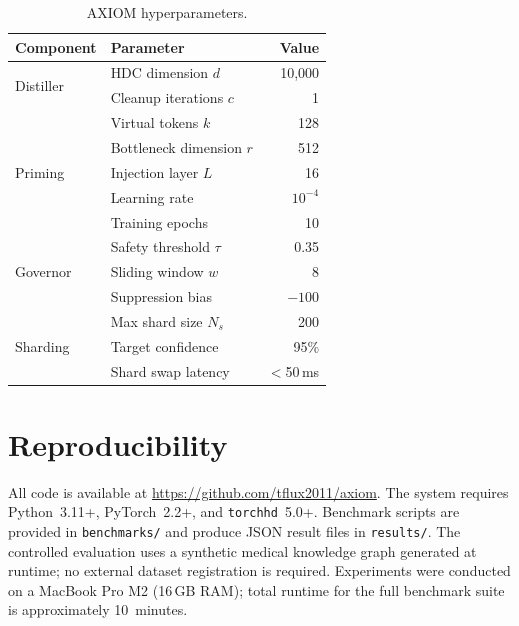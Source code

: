 \documentclass[11pt,a4paper]{article}
\begin{document}
\begin{table}[h]
    \centering
    \caption{AXIOM hyperparameters.}
    \label{tab:hyperparams}
    \begin{tabular}{@{}llr@{}}
        \toprule
        \textbf{Component} & \textbf{Parameter} & \textbf{Value} \\
        \midrule
        \multirow{2}{*}{Distiller}
            & HDC dimension $d$ & 10{,}000 \\
            & Cleanup iterations $c$ & 1 \\
        \midrule
        \multirow{5}{*}{Priming}
            & Virtual tokens $k$ & 128 \\
            & Bottleneck dimension $r$ & 512 \\
            & Injection layer $L$ & 16 \\
            & Learning rate & $10^{-4}$ \\
            & Training epochs & 10 \\
        \midrule
        \multirow{3}{*}{Governor}
            & Safety threshold $\tau$ & 0.35 \\
            & Sliding window $w$ & 8 \\
            & Suppression bias & $-100$ \\
        \midrule
        \multirow{3}{*}{Sharding}
            & Max shard size $N_s$ & 200 \\
            & Target confidence & 95\% \\
            & Shard swap latency & $<$50\,ms \\
        \bottomrule
    \end{tabular}
\end{table}

\section{Reproducibility}
\label{app:reproduce}

All code is available at \url{https://github.com/tflux2011/axiom}.
The system requires Python~3.11+, PyTorch~2.2+, and \texttt{torchhd}~5.0+.
Benchmark scripts are provided in \texttt{benchmarks/} and produce JSON
result files in \texttt{results/}.  The controlled evaluation uses a
synthetic medical knowledge graph generated at runtime; no external
dataset registration is required.  Experiments were conducted on a
MacBook Pro M2 (16\,GB RAM); total runtime for the full benchmark suite
is approximately 10~minutes.
\end{document}
